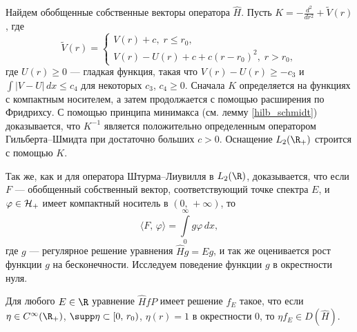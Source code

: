 \documentclass[a4paper
]{article}
\begin{document}
Найдем обобщенные собственные векторы оператора $\hat H$. Пусть
$K=-\frac{d^2}{dr^2}+\tilde V(r)$, где $$\tilde V(r)=\left\{ \begin{array}{l}
V(r)+c, \; r\le r_0, \\ V(r)-U(r)+c+c(r-r_0)^2, \; r>r_0, \end{array}\right.$$
где $U(r)\ge 0$ --- гладкая функция, такая что $V(r)-U(r)\ge -c_3$ и
$\int |V-U|\, dx\le c_4$ для некоторых $c_3$, $c_4\ge 0$.
Сначала $K$ определяется на функциях с компактным носителем, а затем
продолжается с помощью расширения по Фридрихсу. С помощью принципа
минимакса (см. лемму \ref{hilb_schmidt}) доказывается, что $K^{-1}$ является
положительно определенным оператором Гильберта--Шмидта при достаточно
больших $c>0$. Оснащение $L_2(\R_+)$ строится с помощью $K$. \par
Так же, как и для оператора Штурма--Лиувилля в $L_2(\R)$, доказывается,
что если $F$ --- обобщенный собственный вектор, соответствующий точке
спектра $E$, и $\varphi\in {\cal H}_+$ имеет компактный носитель в
$(0, \, +\infty)$, то
$$\langle F, \, \varphi\rangle=\int \limits_0^\infty g\varphi\, dx,$$
где $g$ --- регулярное решение уравнения $\hat Hg=Eg$, и так же оценивается
рост функции $g$ на бесконечности. Исследуем поведение функции $g$
в окрестности нуля.
\begin{Lem}
\label{existence_lemma}
Для любого $E\in \R$ уравнение $\hat HfP$ имеет решение $f_E$ такое, что
если $\eta\in C^\infty(\R_+)$, $\supp \eta \subset [0, \, r_0)$,
$\eta(r)=1$ в окрестности 0, то $\eta f_E\in D(\hat H)$.
\end{Lem}
\end{document}
